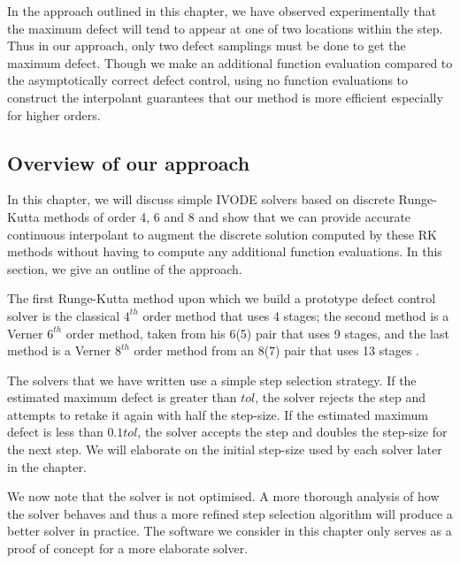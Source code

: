 In the approach outlined in this chapter, we have observed experimentally that the maximum defect will tend to appear at one of two locations within the step. Thus in our approach, only two defect samplings must be done to get the maximum defect. Though we make an additional function evaluation compared to the asymptotically correct defect control, using no function evaluations to construct the interpolant guarantees that our method is more efficient especially for higher orders.


\subsection{Overview of our approach}
\label{section:basic_runge_kutta}
In this chapter, we will discuss simple IVODE solvers based on discrete Runge-Kutta methods of order 4, 6 and 8 and show that we can provide accurate continuous interpolant to augment the discrete solution computed by these RK methods without having to compute any additional function evaluations. In this section, we give an outline of the approach.

The first Runge-Kutta method upon which we build a prototype defect control solver is the classical $4^{th}$ order method that uses 4 stages; the second method is a Verner $6^{th}$ order method, taken from his 6(5) pair \cite{JimVernerRepo} that uses 9 stages, and the last method is a Verner $8^{th}$ order method from an 8(7) pair that uses 13 stages \cite{MR1239829}. 

The solvers that we have written use a simple step selection strategy. If the estimated maximum defect is greater than $tol$, the solver rejects the step and attempts to retake it again with half the step-size. If the estimated maximum defect is less than $0.1tol$, the solver accepts the step and doubles the step-size for the next step. We will elaborate on the initial step-size used by each solver later in the chapter.

We now note that the solver is not optimised. A more thorough analysis of how the solver behaves and thus a more refined step selection algorithm will produce a better solver in practice. The software we consider in this chapter only serves as a proof of concept for a more elaborate solver. 